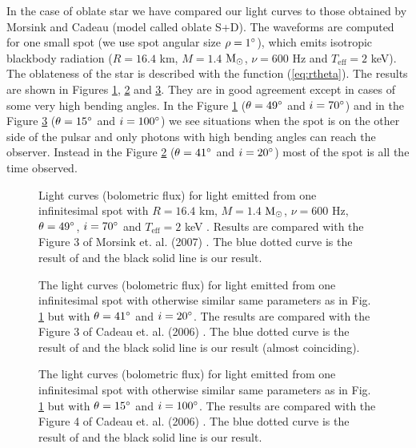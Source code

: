 \documentclass{wihuri}
\def\msun{{\rm M_{\odot}}}
\begin{document}
In the case of oblate star we have compared our light curves to those obtained by Morsink \cite{morsink} and Cadeau \cite{cadeau} (model called oblate S+D). The waveforms are computed for one small spot (we use spot angular size $\rho = 1 \degree$), which emits isotropic blackbody radiation ($R = 16.4$ km, $M = 1.4$ $\msun$, $\nu = 600$ Hz and $T_{\mathrm{eff}} = 2$ keV). The oblateness of the star is described with the function (\ref{eq:rtheta}). The results are shown in Figures \ref{fig:mor3}, \ref{fig:cad3} and \ref{fig:cad4}. They are in good agreement except in cases of some very high bending angles. In the Figure \ref{fig:mor3} ($\theta = 49 \degree$ and $i = 70 \degree$) and in the Figure \ref{fig:cad4} ($\theta = 15 \degree$ and $i = 100 \degree$) we see situations when the spot is on the other side of the pulsar and only photons with high bending angles can reach the observer. Instead in the Figure \ref{fig:cad3} ($\theta = 41 \degree$ and $i = 20 \degree$) most of the spot is all the time observed. 


\begin{figure}
\centerline{}
\caption{Light curves (bolometric flux) for light emitted from one infinitesimal spot with $R = 16.4$ km, $M = 1.4$ $\msun$, $\nu = 600$ Hz, $\theta = 49 \degree$, $i = 70 \degree$ and $T_{\mathrm{eff}} = 2$ keV . Results are compared with the Figure 3 of Morsink et. al. (2007) \cite{morsink}. The blue dotted curve is the result of \cite{morsink} and the black solid line is our result.
\label{fig:mor3}}
\end{figure}


\begin{figure}
\centerline{}
\caption{The light curves (bolometric flux) for light emitted from one infinitesimal spot with otherwise similar same parameters as in Fig. \ref{fig:mor3} but with $\theta = 41 \degree$ and $i = 20 \degree$. The results are compared with the Figure 3 of Cadeau et. al. (2006) \cite{cadeau}. The blue dotted curve is the result of \cite{cadeau} and the black solid line is our result (almost coinciding).
\label{fig:cad3}}
\end{figure}


\begin{figure}
\centerline{}
\caption{The light curves (bolometric flux) for light emitted from one infinitesimal spot with otherwise similar same parameters as in Fig. \ref{fig:mor3} but with $\theta = 15 \degree$ and $i = 100 \degree$. The results are compared with the Figure 4 of Cadeau et. al. (2006) \cite{cadeau}. The blue dotted curve is the result of \cite{cadeau} and the black solid line is our result.
\label{fig:cad4}}
\end{figure}
\end{document}
